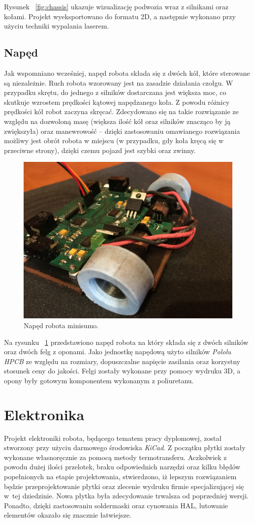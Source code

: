 Rysunek ~\ref{fig:chassis} ukazuje wizualizację podwozia wraz z silnikami oraz kołami. Projekt wyeksportowano do formatu 2D, a następnie wykonano przy użyciu techniki wypalania laserem. 

\subsection{Napęd}
Jak wspomniano wcześniej, napęd robota składa się z dwóch kół, które sterowane są niezależnie. Ruch robota wzorowany jest na zasadzie działania czołgu. W przypadku skrętu, do jednego z silników dostarczana jest większa moc, co skutkuje wzrostem prędkości kątowej napędzanego koła. Z powodu różnicy prędkości kół robot zaczyna skręcać. Zdecydowano się na takie rozwiązanie ze względu na dozwoloną masę (większa ilość kół oraz silników znacząco by ją zwiększyła) oraz manewrowość – dzięki zastosowaniu omawianego rozwiązania możliwy jest obrót robota w miejscu (w przypadku, gdy koła kręcą się w przeciwne strony), dzięki czemu pojazd jest szybki oraz zwinny. 

\begin{figure}[H]
	\centering
		\includegraphics[width=0.75\linewidth]{pic04/drive.JPG}
	\caption{Napęd robota minisumo.}
	\label{fig:drive}	
\end{figure}

Na rysunku ~\ref{fig:drive} przedstawiono napęd robota na który składa się z dwóch silników oraz dwóch felg z oponami. Jako jednostkę napędową użyto silników \textit{Pololu HPCB} ze względu na rozmiary, dopuszczalne napięcie zasilania oraz korzystny stosunek ceny do jakości. Felgi zostały wykonane przy pomocy wydruku 3D, a opony były gotowym komponentem wykonanym z poliuretanu.

\section{Elektronika}
Projekt elektroniki robota, będącego tematem pracy dyplomowej, został stworzony przy użyciu darmowego środowiska \textit{KiCad}. Z początku płytki zostały wykonane własnoręcznie za pomocą metody termotransferu. Aczkolwiek z powodu dużej ilości przelotek, braku odpowiednich narzędzi oraz kilku błędów popełnionych na etapie projektowania, stwierdzono, iż lepszym rozwiązaniem będzie przeprojektowanie płytki oraz zlecenie wydruku firmie specjalizującej się w~tej dziedzinie. Nowa płytka była zdecydowanie trwalsza od poprzedniej wersji. Ponadto, dzięki zastosowaniu soldermaski oraz cynowania HAL, lutowanie elementów okazało się znacznie łatwiejsze.  

